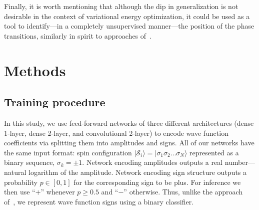 Finally, it is worth mentioning that although the dip in generalization is not desirable in the context of variational energy optimization, it could be used as a tool to identify---in a completely unsupervised manner---the position of the phase transitions, similarly in spirit to approaches of~\cite{van2017learning,broecker2017quantum,hu2017discovering,doggen2018many}.


\section{Methods}
\subsection{Training procedure}

In this study, we use feed-forward networks of three different architectures (dense 1-layer, dense 2-layer, and convolutional 2-layer) to encode wave function coefficients via splitting them into amplitudes and signs. All of our networks have the same input format: spin configuration $|\mathcal{S}_i\rangle = |\sigma_1 \sigma_2 \ldots \sigma_N\rangle$ represented as a binary sequence, $\sigma_k=\pm 1$. Network encoding amplitudes outputs a real number---natural logarithm of the amplitude. Network encoding sign structure outputs a probability $p \in [0, 1]$ for the corresponding sign to be plus. For inference we then use ``$+$'' whenever $p \geq 0.5$ and ``$-$'' otherwise. Thus, unlike the approach of~\cite{Carleo}, we represent wave function signs using a binary classifier.

